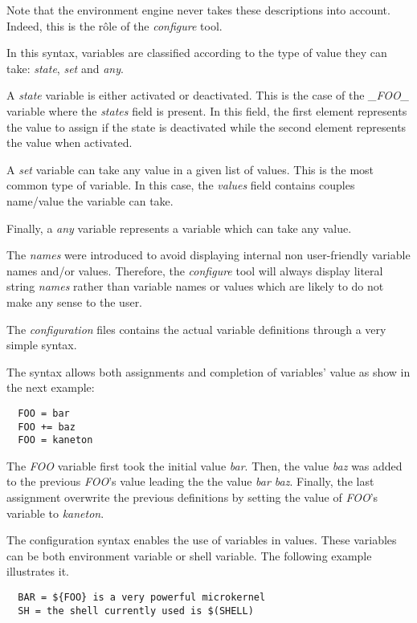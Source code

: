 Note that the environment engine never takes these descriptions into account.
Indeed, this is the r\^ole of the \textit{configure} tool.

In this syntax, variables are classified according to the type of value
they can take: \textit{state}, \textit{set} and \textit{any}.

A \textit{state} variable is either activated or deactivated. This is
the case of the \textit{\_FOO\_} variable where the \textit{states}
field is present. In this field, the first element represents the value
to assign if the state is deactivated while the second element represents
the value when activated.

A \textit{set} variable can take any value in a given list of values. This
is the most common type of variable. In this case, the \textit{values} field
contains couples name/value the variable can take.

Finally, a \textit{any} variable represents a variable which can take any
value.

The \textit{names} were introduced to avoid displaying internal
non user-friendly variable names and/or values. Therefore, the
\textit{configure} tool will always display literal string \textit{names}
rather than variable names or values which are likely to do not make any
sense to the user.



The \textit{configuration} files contains the actual variable definitions
through a very simple syntax.

The syntax allows both assignments and completion of variables' value
as show in the next example:

\begin{verbatim}
  FOO = bar
  FOO += baz
  FOO = kaneton
\end{verbatim}

The \textit{FOO} variable first took the initial value \textit{bar}. Then,
the value \textit{baz} was added to the previous \textit{FOO}'s value
leading the the value \textit{bar baz}. Finally, the last assignment
overwrite the previous definitions by setting the value of \textit{FOO}'s
variable to \textit{kaneton}.

The configuration syntax enables the use of variables in values. These
variables can be both environment variable or shell variable. The following
example illustrates it.

\begin{verbatim}
  BAR = ${FOO} is a very powerful microkernel
  SH = the shell currently used is $(SHELL)
\end{verbatim}

